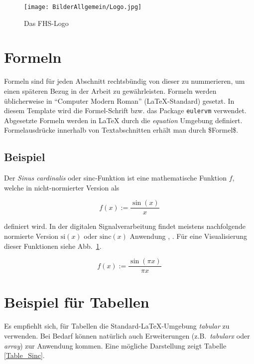 \begin{figure}[H]
\begin{center}
	\texttt{[image: BilderAllgemein/Logo.jpg]}
\end{center}
	\caption{Das FHS-Logo}
	\label{FIG_LOGO}
\end{figure}

\section{Formeln}

Formeln sind für jeden Abschnitt rechtsbündig von dieser zu nummerieren, um einen späteren Bezug in der Arbeit zu gewährleisten. Formeln werden üblicherweise in "`Computer Modern Roman"' (\LaTeX{}-Standard) gesetzt. In diesem Template wird die Formel-Schrift bzw. das Package \texttt{eulervm} verwendet. Abgesetzte Formeln werden in \LaTeX{} durch die 
\emph{equation} Umgebung definiert. Formelausdrücke innerhalb von Textabschnitten erhält man durch \$Formel\$.

\subsection*{Beispiel}
%
Der \emph{Sinus cardinalis} oder sinc-Funktion ist eine mathematische Funktion $f$, welche in nicht-normierter Version als

\begin{equation}
	f(x) := \frac{\sin(x)}{x}
	\label{eq:bsp}
\end{equation}

definiert wird. In der digitalen Signalverarbeitung findet meistens nachfolgende normierte Version $\mathrm{si}(x)$ oder $\mathrm{sinc}(x)$ Anwendung \cite{x1}, \cite{x2}. Für eine Visualisierung dieser Funktionen siehe Abb.~\ref{FIG_LOGO}.

\begin{equation}
	f(x) := \frac{\sin(\pi x)}{\pi x}
	\label{EQ_SAMPLE}
\end{equation}

\section{Beispiel für Tabellen}
%
Es empfiehlt sich, für Tabellen die Standard-\LaTeX{}-Umgebung \emph{tabular} zu verwenden. Bei Bedarf können natürlich auch Erweiterungen (z.B.~\emph{tabularx} oder \emph{array}) zur Anwendung kommen. Eine mögliche Darstellung zeigt Tabelle \ref{Table_Sinc}.

